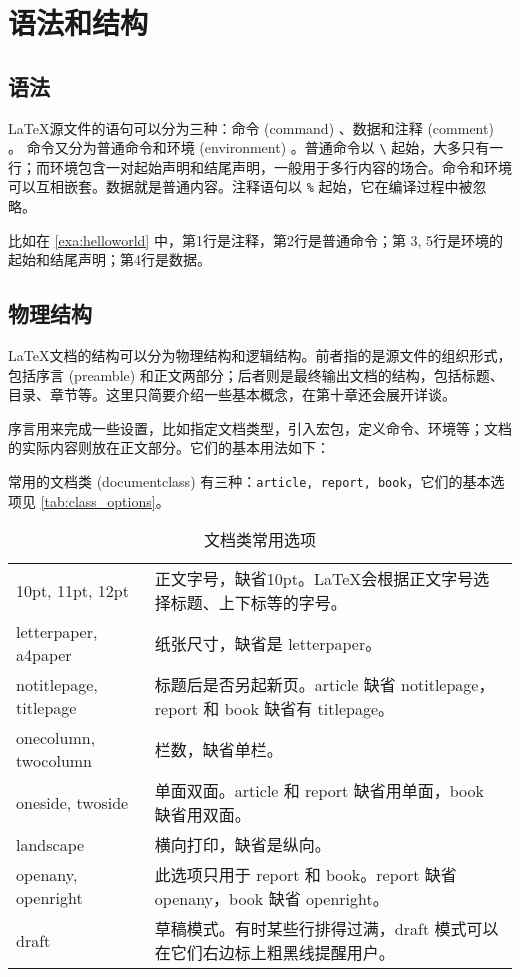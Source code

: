 \section{语法和结构}\label{sec:structure}

\subsection{语法}

\LaTeX 源文件的语句可以分为三种：命令 (command) 、数据和注释 (comment) 。
命令又分为普通命令和环境 (environment) 。普通命令以 \verb|\| 起始，大多只有一行；而环境包含一对起始声明和结尾声明，一般用于多行内容的场合。命令和环境可以互相嵌套。数据就是普通内容。注释语句以 \verb|%| 起始，它在编译过程中被忽略。

比如在 \autoref{exa:helloworld} 中，第1行是注释，第2行是普通命令；第
3, 5行是环境的起始和结尾声明；第4行是数据。

\subsection{物理结构}

\LaTeX 文档的结构可以分为物理结构和逻辑结构。前者指的是源文件的组织形式，包括序言 (preamble) 和正文两部分；后者则是最终输出文档的结构，包括标题、目录、章节等。这里只简要介绍一些基本概念，在第十章还会展开详谈。

序言用来完成一些设置，比如指定文档类型，引入宏包，定义命令、环境等；文档的实际内容则放在正文部分。它们的基本用法如下：


常用的文档类 (documentclass) 有三种：\texttt{article, report, book}，它们的基本选项见 \autoref{tab:class_options}。

\begin{table}[htbp]
\centering
\caption{文档类常用选项}
\label{tab:class_options}
\begin{tabularx}{350pt}{lX}
  \toprule
  10pt, 11pt, 12pt & 正文字号，缺省10pt。\LaTeX 会根据正文字号选择标题、上下标等的字号。\\
  letterpaper, a4paper & 纸张尺寸，缺省是 letterpaper。\\
  notitlepage, titlepage & 标题后是否另起新页。article 缺省 notitlepage，report 和 book 缺省有 titlepage。\\
  onecolumn, twocolumn & 栏数，缺省单栏。\\
  oneside, twoside & 单面双面。article 和 report 缺省用单面，book 缺省用双面。\\
  landscape & 横向打印，缺省是纵向。\\
  openany, openright & 此选项只用于 report 和 book。report 缺省 openany，book 缺省 openright。\\
  draft & 草稿模式。有时某些行排得过满，draft 模式可以在它们右边标上粗黑线提醒用户。\\
  \bottomrule
\end{tabularx}
\end{table}

